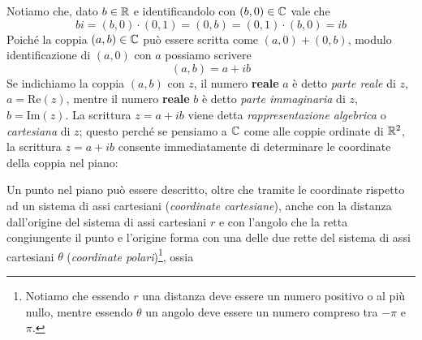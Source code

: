 \begin{remark}
    Notiamo che, dato $b\in\amsbb{R}$ e identificandolo con $(b,0)\in\amsbb{C}$ vale che
    \[
    bi = (b,0)\cdot(0,1) = (0,b) = (0,1)\cdot(b,0) = ib
    \]
    Poiché la coppia $(a,b)\in\amsbb{C}$ può essere scritta come $(a,0) + (0,b)$, modulo identificazione di $(a,0)$ con $a$ possiamo scrivere
    \[
    (a,b) = a+ib
    \]
    Se indichiamo la coppia $(a,b)$ con $z$, il numero \textbf{reale} $a$ è detto \emph{parte reale} di $z$, $a=\text{Re}(z)$, mentre il numero \textbf{reale} $b$ è detto \emph{parte immaginaria} di $z$, $b=\text{Im}(z)$. La scrittura $z=a+ib$ viene detta \emph{rappresentazione algebrica} o \emph{cartesiana} di $z$; questo perché se pensiamo a $\amsbb{C}$ come alle coppie ordinate di $\amsbb{R}^2$, la scrittura $z=a+ib$ consente immediatamente di determinare le coordinate della coppia nel piano:
    \begin{center}
    \end{center}
    Un punto nel piano può essere descritto, oltre che tramite le coordinate rispetto ad un sistema di assi cartesiani (\emph{coordinate cartesiane}), anche con la distanza dall'origine del sistema di assi cartesiani $r$ e con l'angolo che la retta congiungente il punto e l'origine forma con una delle due rette del sistema di assi cartesiani $\theta$ (\emph{coordinate polari})\footnote{Notiamo che essendo $r$ una distanza deve essere un numero positivo o al più nullo, mentre essendo $\theta$ un angolo deve essere un numero compreso tra $-\pi$ e $\pi$.}, ossia
    \begin{center}
    \end{center}
\end{remark}
